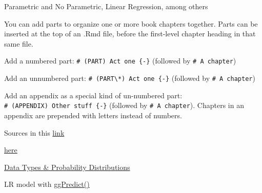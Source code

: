 \documentclass[
]{book}
\begin{document}
Parametric and No Parametric, Linear Regression, among others

You can add parts to organize one or more book chapters together. Parts can be inserted at the top of an .Rmd file, before the first-level chapter heading in that same file.

Add a numbered part: \texttt{\#\ (PART)\ Act\ one\ \{-\}} (followed by \texttt{\#\ A\ chapter})

Add an unnumbered part: \texttt{\#\ (PART\textbackslash{}*)\ Act\ one\ \{-\}} (followed by \texttt{\#\ A\ chapter})

Add an appendix as a special kind of un-numbered part: \texttt{\#\ (APPENDIX)\ Other\ stuff\ \{-\}} (followed by \texttt{\#\ A\ chapter}). Chapters in an appendix are prepended with letters instead of numbers.

Sources in this \href{https://cienciadedatos.net/estadistica-con-r}{link}

\href{https://www.datanalytics.com/libro_r/index.html}{here}

\href{https://fcorowe.github.io/sl/d1n1_intro.html}{Data Types \& Probability Distributions}

LR model with \href{https://cran.r-project.org/web/packages/ggiraphExtra/vignettes/ggPredict.html}{ggPredict()}
\end{document}
